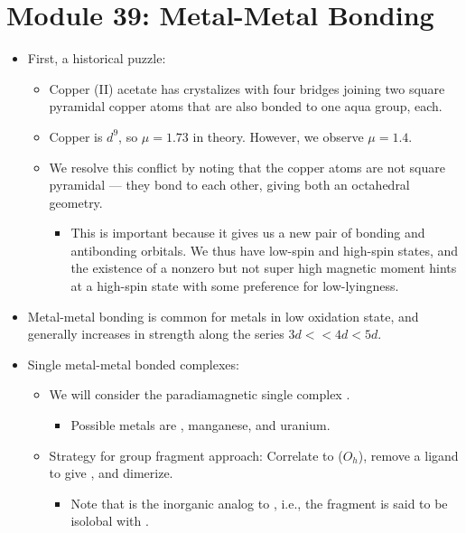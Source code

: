 \documentclass[../notes.tex]{subfiles}
\begin{document}
\section{Module 39: Metal-Metal Bonding}
\begin{itemize}
    \item First, a historical puzzle:
    \begin{itemize}
        \item Copper (II) acetate has crystalizes with four  bridges joining two square pyramidal copper atoms that are also bonded to one aqua group, each.
        \item Copper is $d^9$, so $\mu=1.73$ in theory. However, we observe $\mu=1.4$.
        \item We resolve this conflict by noting that the copper atoms are not square pyramidal --- they bond to each other, giving both an octahedral geometry.
        \begin{itemize}
            \item This is important because it gives us a new pair of bonding and antibonding orbitals. We thus have low-spin and high-spin states, and the existence of a nonzero but not super high magnetic moment hints at a high-spin state with some preference for low-lyingness.
        \end{itemize}
    \end{itemize}
    \item Metal-metal bonding is common for metals in low oxidation state, and generally increases in strength along the series $3d<<4d<5d$.
    \item Single metal-metal bonded complexes:
    \begin{itemize}
        \item We will consider the paradiamagnetic single  complex .
        \begin{itemize}
            \item Possible metals are , manganese, and uranium.
        \end{itemize}
        \item Strategy for group fragment approach: Correlate to  ($O_h$), remove a ligand to give , and dimerize.
        \begin{itemize}
            \item Note that  is the inorganic analog to , i.e., the  fragment is said to be isolobal with .
        \end{itemize}

\end{itemize}
\end{itemize}
\end{document}

